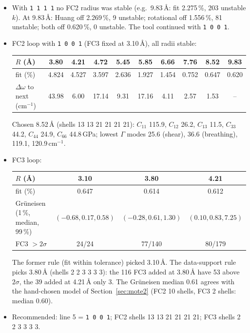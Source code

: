 \documentclass[11pt,a4paper]{article}
\newcommand{\code}[1]{\texttt{#1}}
\begin{document}
\begin{itemize}
\item With \code{1 1 1 1} no FC2 radius was stable (e.g.\ 9.83\,\AA: fit 2.275\,\%, 203 unstable $k$). At 9.83\,\AA: Huang off
2.269\,\%, 9 unstable; rotational off 1.556\,\%, 81 unstable; both off 0.620\,\%, 0 unstable. The tool continued with
\code{1 0 0 1}.
\item FC2 loop with \code{1 0 0 1} (FC3 fixed at 3.10\,\AA), all radii stable:
\begin{center}
\small
\begin{tabular}{@{}lccccccccc@{}}
\toprule
$R$ (\AA) & 3.80 & 4.21 & 4.72 & 5.45 & 5.85 & 6.66 & 7.76 & 8.52 & 9.83\\
\midrule
fit (\%) & 4.824 & 4.527 & 3.597 & 2.636 & 1.927 & 1.454 & 0.752 & 0.647 & 0.620\\
$\Delta\omega$ to next (cm$^{-1}$) & 43.98 & 6.00 & 17.14 & 9.31 & 17.16 & 4.11 & 2.57 & 1.53 & --\\
\bottomrule
\end{tabular}
\end{center}
Chosen 8.52\,\AA{} (shells 13 13 21 21 21 21): $C_{11}$ 115.9, $C_{12}$ 26.2, $C_{13}$ 11.5, $C_{33}$ 44.2, $C_{44}$ 24.9,
$C_{66}$ 44.8\,GPa; lowest $\Gamma$ modes 25.6 (shear), 36.6 (breathing), 119.1, 120.9\,cm$^{-1}$.
\item FC3 loop:
\begin{center}
\small
\begin{tabular}{@{}lccc@{}}
\toprule
$R$ (\AA) & 3.10 & 3.80 & 4.21\\
\midrule
fit (\%) & 0.647 & 0.614 & 0.612\\
Gr\"uneisen (1\,\%, median, 99\,\%) & $(-0.68, 0.17, 0.58)$ & $(-0.28, 0.61, 1.30)$ & $(0.10, 0.83, 7.25)$\\
FC3 $>2\sigma$ & 24/24 & 77/140 & 80/179\\
\bottomrule
\end{tabular}
\end{center}
The former rule (fit within tolerance) picked 3.10\,\AA. The data-support rule picks 3.80\,\AA{} (shells 2 2 3 3 3 3): the
116 FC3 added at 3.80\,\AA{} have 53 above $2\sigma$, the 39 added at 4.21\,\AA{} only 3. The Gr\"uneisen median 0.61 agrees
with the hand-chosen model of Section~\ref{sec:mote2} (FC2 10 shells, FC3 2 shells: median 0.60).
\item Recommended: line 5 = \code{1 0 0 1}; FC2 shells 13 13 21 21 21 21; FC3 shells 2 2 3 3 3 3.
\end{itemize}
\end{document}
